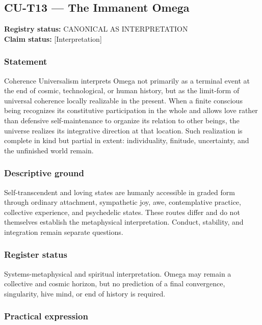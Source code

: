 \documentclass[
  11pt,
]{article}
\begin{document}
\subsection{CU-T13 --- The Immanent
Omega}\label{cu-t13-the-immanent-omega}

\textbf{Registry status:} CANONICAL AS INTERPRETATION\\
\textbf{Claim status:} {[}Interpretation{]}

\subsubsection{Statement}\label{statement-62}

Coherence Universalism interprets Omega not primarily as a terminal
event at the end of cosmic, technological, or human history, but as the
limit-form of universal coherence locally realizable in the present.
When a finite conscious being recognizes its constitutive participation
in the whole and allows love rather than defensive self-maintenance to
organize its relation to other beings, the universe realizes its
integrative direction at that location. Such realization is complete in
kind but partial in extent: individuality, finitude, uncertainty, and
the unfinished world remain.

\subsubsection{Descriptive ground}\label{descriptive-ground-4}

Self-transcendent and loving states are humanly accessible in graded
form through ordinary attachment, sympathetic joy, awe, contemplative
practice, collective experience, and psychedelic states. These routes
differ and do not themselves establish the metaphysical interpretation.
Conduct, stability, and integration remain separate questions.

\subsubsection{Register status}\label{register-status-4}

Systems-metaphysical and spiritual interpretation. Omega may remain a
collective and cosmic horizon, but no prediction of a final convergence,
singularity, hive mind, or end of history is required.

\subsubsection{Practical expression}\label{practical-expression-4}
\end{document}
